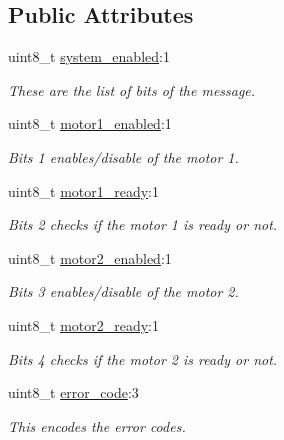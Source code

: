 \subsection*{Public Attributes}
\begin{DoxyCompactItemize}
\item 
uint8\+\_\+t \hyperlink{classblmc__drivers_1_1MotorBoardStatus_a9984f10f289f1a853dd4e34544be2c9d}{system\+\_\+enabled}\+:1
\begin{DoxyCompactList}\small\item\em These are the list of bits of the message. \end{DoxyCompactList}\item 
\mbox{\label{classblmc__drivers_1_1MotorBoardStatus_ae571da09a338790e07847efb068168af}} 
uint8\+\_\+t \hyperlink{classblmc__drivers_1_1MotorBoardStatus_ae571da09a338790e07847efb068168af}{motor1\+\_\+enabled}\+:1
\begin{DoxyCompactList}\small\item\em Bits 1 enables/disable of the motor 1. \end{DoxyCompactList}\item 
\mbox{\label{classblmc__drivers_1_1MotorBoardStatus_a223efb9b461331c2e80b922ec29458cf}} 
uint8\+\_\+t \hyperlink{classblmc__drivers_1_1MotorBoardStatus_a223efb9b461331c2e80b922ec29458cf}{motor1\+\_\+ready}\+:1
\begin{DoxyCompactList}\small\item\em Bits 2 checks if the motor 1 is ready or not. \end{DoxyCompactList}\item 
\mbox{\label{classblmc__drivers_1_1MotorBoardStatus_a3f21330096dc12e6ef6fa2cd2d628c06}} 
uint8\+\_\+t \hyperlink{classblmc__drivers_1_1MotorBoardStatus_a3f21330096dc12e6ef6fa2cd2d628c06}{motor2\+\_\+enabled}\+:1
\begin{DoxyCompactList}\small\item\em Bits 3 enables/disable of the motor 2. \end{DoxyCompactList}\item 
\mbox{\label{classblmc__drivers_1_1MotorBoardStatus_a4f0191a042a1968c8938177ad13fb760}} 
uint8\+\_\+t \hyperlink{classblmc__drivers_1_1MotorBoardStatus_a4f0191a042a1968c8938177ad13fb760}{motor2\+\_\+ready}\+:1
\begin{DoxyCompactList}\small\item\em Bits 4 checks if the motor 2 is ready or not. \end{DoxyCompactList}\item 
uint8\+\_\+t \hyperlink{classblmc__drivers_1_1MotorBoardStatus_ad1a5cb78d86e76a60750c0e3e6b34b7e}{error\+\_\+code}\+:3
\begin{DoxyCompactList}\small\item\em This encodes the error codes. \end{DoxyCompactList}\end{DoxyCompactItemize}


